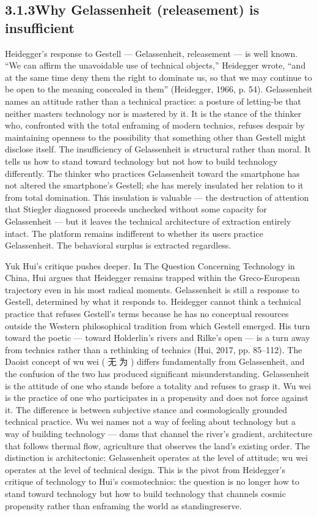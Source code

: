 \subsection{3.1.3\quad Why Gelassenheit (releasement) is insufficient}

Heidegger’s response to Gestell — Gelassenheit, releasement — is well known. “We can affirm the unavoidable use of technical objects,” Heidegger wrote, “and at the same time deny them the right to dominate us, so that we may continue to be open to the meaning concealed in them” (Heidegger, 1966, p. 54). Gelassenheit names an attitude rather than a technical practice: a posture of letting-be that neither masters technology nor is mastered by it. It is the stance of the thinker who, confronted with the total enframing of modern technics, refuses despair by maintaining openness to the possibility that something other than Gestell might disclose itself. The insufficiency of Gelassenheit is structural rather than moral. It tells us how to stand toward technology but not how to build technology differently. The thinker who practices Gelassenheit toward the smartphone has not altered the smartphone’s Gestell; she has merely insulated her relation to it from total domination. This insulation is valuable — the destruction of attention that Stiegler diagnosed proceeds unchecked without some capacity for Gelassenheit — but it leaves the technical architecture of extraction entirely intact. The platform remains indifferent to whether its users practice Gelassenheit. The behavioral surplus is extracted regardless.

Yuk Hui’s critique pushes deeper. In The Question Concerning Technology in China, Hui argues that Heidegger remains trapped within the Greco-European trajectory even in his most radical moments. Gelassenheit is still a response to Gestell, determined by what it responds to. Heidegger cannot think a technical practice that refuses Gestell’s terms because he has no conceptual resources outside the Western philosophical tradition from which Gestell emerged. His turn toward the poetic — toward Holderlin’s rivers and Rilke’s open — is a turn away from technics rather than a rethinking of technics (Hui, 2017, pp. 85–112). The Daoist concept of wu wei ( 无 为 ) differs fundamentally from Gelassenheit, and the confusion of the two has produced significant misunderstanding. Gelassenheit is the attitude of one who stands before a totality and refuses to grasp it. Wu wei is the practice of one who participates in a propensity and does not force against it. The difference is between subjective stance and cosmologically grounded technical practice. Wu wei names not a way of feeling about technology but a way of building technology — dams that channel the river’s gradient, architecture that follows thermal flow, agriculture that observes the land’s existing order. The distinction is architectonic: Gelassenheit operates at the level of attitude; wu wei operates at the level of technical design. This is the pivot from Heidegger’s critique of technology to Hui’s cosmotechnics: the question is no longer how to stand toward technology but how to build technology that channels cosmic propensity rather than enframing the world as standingreserve.

